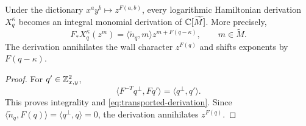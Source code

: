 \begin{proposition}\label{prop:integral-cofactor}
Under the dictionary $x^ay^b\mapsto z^{F(a,b)}$, every logarithmic
Hamiltonian derivation $X^\kappa_q$ becomes an integral monomial derivation
of $\mathbb C[\widetilde M]$.  More precisely,
\begin{equation}\label{eq:transported-derivation}
 F_*X^\kappa_q(z^m)
 =\langle\widetilde n_q,m\rangle z^{m+F(q-\kappa)},
 \qquad m\in\widetilde M.
\end{equation}
The derivation annihilates the wall character $z^{F(q)}$ and shifts
exponents by $F(q-\kappa)$.
\end{proposition}

\begin{proof}
For $q'\in\mathbb Z^2_{x,y}$,
\[
 \langle F^{-T}q^\perp,Fq'\rangle=\langle q^\perp,q'\rangle.
\]
This proves integrality and \eqref{eq:transported-derivation}.  Since
$\langle\widetilde n_q,F(q)\rangle=\langle q^\perp,q\rangle=0$, the
derivation annihilates $z^{F(q)}$.
\end{proof}

